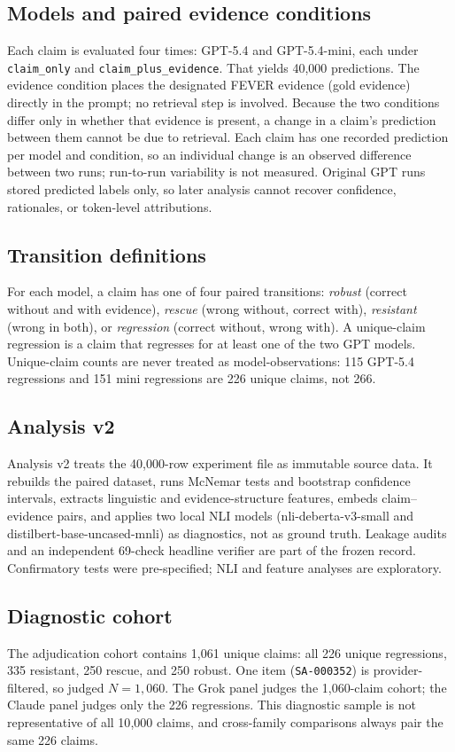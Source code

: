\subsection{Models and paired evidence conditions}
Each claim is evaluated four times: GPT-5.4 and GPT-5.4-mini, each under \texttt{claim\_only} and \texttt{claim\_plus\_evidence}.
That yields 40{,}000 predictions.
The evidence condition places the designated FEVER evidence (gold evidence) directly in the prompt; no retrieval step is involved.
Because the two conditions differ only in whether that evidence is present, a change in a claim's prediction between them cannot be due to retrieval.
Each claim has one recorded prediction per model and condition, so an individual change is an observed difference between two runs; run-to-run variability is not measured.
Original GPT runs stored predicted labels only, so later analysis cannot recover confidence, rationales, or token-level attributions.

\subsection{Transition definitions}
For each model, a claim has one of four paired transitions:
\emph{robust} (correct without and with evidence),
\emph{rescue} (wrong without, correct with),
\emph{resistant} (wrong in both),
or \emph{regression} (correct without, wrong with).
A unique-claim regression is a claim that regresses for at least one of the two GPT models.
Unique-claim counts are never treated as model-observations: 115 GPT-5.4 regressions and 151 mini regressions are 226 unique claims, not 266.

\subsection{Analysis v2}
Analysis v2 treats the 40{,}000-row experiment file as immutable source data.
It rebuilds the paired dataset, runs McNemar tests and bootstrap confidence intervals, extracts linguistic and evidence-structure features, embeds claim--evidence pairs, and applies two local NLI models (nli-deberta-v3-small and distilbert-base-uncased-mnli) as diagnostics, not as ground truth.
Leakage audits and an independent 69-check headline verifier are part of the frozen record.
Confirmatory tests were pre-specified; NLI and feature analyses are exploratory.

\subsection{Diagnostic cohort}
The adjudication cohort contains 1{,}061 unique claims: all 226 unique regressions, 335 resistant, 250 rescue, and 250 robust.
One item (\texttt{SA-000352}) is provider-filtered, so judged $N=1{,}060$.
The Grok panel judges the 1{,}060-claim cohort; the Claude panel judges only the 226 regressions.
This diagnostic sample is not representative of all 10{,}000 claims, and cross-family comparisons always pair the same 226 claims.

